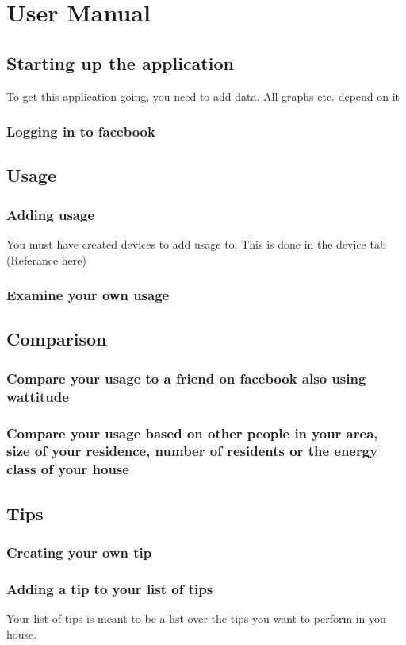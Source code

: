 \chapter{User Manual}

\section{Starting up the application}
To get this application going, you need to add data. All graphs etc. depend on it
\subsection{Logging in to facebook}

\section{Usage}
\subsection{Adding usage}
You must have created devices to add usage to. This is done in the device tab (Referance here)
\subsection{Examine your own usage}

\section{Comparison}
\subsection{Compare your usage to a friend on facebook also using wattitude}
\subsection{Compare your usage based on other people in your area, size of your residence, number of residents or the energy class of your house}

\section{Tips}
\subsection{Creating your own tip}
\subsection{Adding a tip to your list of tips}
Your list of tips is meant to be a list over the tips you want to perform in you house. 
